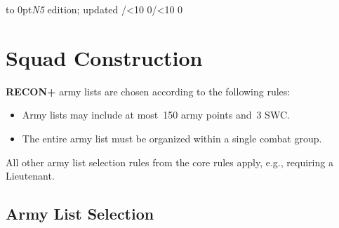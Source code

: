 \documentclass[14pt,dvipsnames]{extarticle}
\def\twodigits#1{\ifnum#1<10 0\fi\the#1}
\newcommand{\reconplus}{\textbf{RECON+}\xspace}
\begin{document}
\tableofcontents

\vspace{-16pt}
\hbox to 0pt{}\hfill{\small \emph{N5} edition; updated \the\year/\twodigits\month/\twodigits\day}

\clearpage
{}

\section{Squad Construction}

\reconplus army lists are chosen according to the following rules:

\vspace{-0.5em}
\begin{itemize}
\item Army lists may include at most~150 army points and~3 SWC.

\item The entire army list must be organized within a single combat
  group.

%
%

\end{itemize}

All other army list selection rules from the core rules apply, e.g.,
requiring a Lieutenant.


\subsection{Army List Selection}
\end{document}
